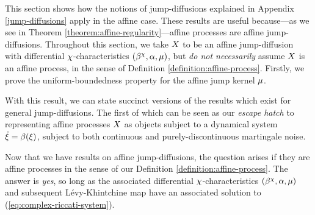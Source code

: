 This section shows how the notions of jump-diffusions explained in Appendix \ref{jump-diffusions} apply in the affine case.
These results are useful because---as we see in Theorem \ref{theorem:affine-regularity}---affine processes are affine jump-diffusions.
Throughout this section, we take $X$ to be an affine jump-diffusion with differential $\chi$-characteristics $(\beta^\chi, \alpha, \mu)$, but \emph{do not necessarily} assume $X$ is an affine process, in the sense of Definition \ref{definition:affine-process}.
Firstly, we prove the uniform-boundedness property for the affine jump kernel $\mu$.



With this result, we can state succinct versions of the results which exist for general jump-diffusions.
The first of which can be seen as our \emph{escape hatch} to representing affine processes $X$ as objects subject to a dynamical system $\dot{\xi} = \beta(\xi)$, subject to both continuous and purely-discontinuous martingale noise.





Now that we have results on affine jump-diffusions, the question arises if they are affine processes in the sense of our Definition \ref{definition:affine-process}.
The answer is \emph{yes}, so long as the associated differential $\chi$-characteristics $(\beta^\chi, \alpha, \mu)$ and subsequent L\'evy-Khintchine map have an associated solution to (\ref{eq:complex-riccati-system}).


